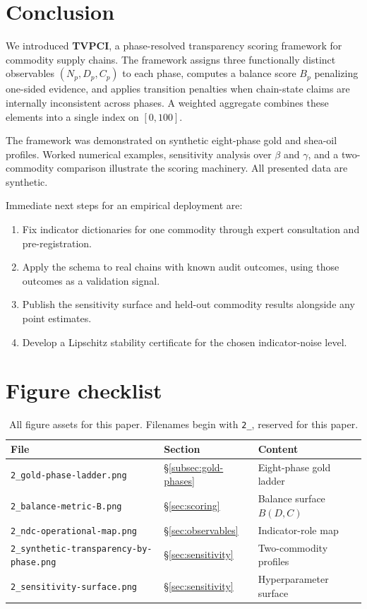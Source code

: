 \documentclass[12pt]{article}
\theoremstyle{remark}
\begin{document}
\section{Conclusion}\label{sec:conclusion}

We introduced \textbf{TVPCI}, a phase-resolved transparency scoring framework for
commodity supply chains.  The framework assigns three functionally distinct observables
$(N_p, D_p, C_p)$ to each phase, computes a balance score $B_p$ penalizing one-sided
evidence, and applies transition penalties when chain-state claims are internally
inconsistent across phases.  A weighted aggregate combines these elements into a single
index on $[0, 100]$.

The framework was demonstrated on synthetic eight-phase gold and shea-oil profiles.
Worked numerical examples, sensitivity analysis over $\beta$ and $\gamma$, and a
two-commodity comparison illustrate the scoring machinery.  All presented data are
synthetic.

Immediate next steps for an empirical deployment are:
\begin{enumerate}
  \item Fix indicator dictionaries for one commodity through expert consultation and
        pre-registration.
  \item Apply the schema to real chains with known audit outcomes, using those outcomes
        as a validation signal.
  \item Publish the sensitivity surface and held-out commodity results alongside any
        point estimates.
  \item Develop a Lipschitz stability certificate for the chosen indicator-noise level.
\end{enumerate}




\appendix
\section{Figure checklist}\label{app:figures}

\begin{table}[ht]
\centering
\caption{All figure assets for this paper.  Filenames begin with \texttt{2\_},
  reserved for this paper.\label{tab:figcheck}}
\renewcommand{\arraystretch}{1.15}
\begin{tabular}{ll>{\raggedright\arraybackslash}p{4.5cm}}
\toprule
File & Section & Content \\
\midrule
\texttt{2\_gold-phase-ladder.png} & \S\ref{subsec:gold-phases} & Eight-phase gold ladder \\
\texttt{2\_balance-metric-B.png} & \S\ref{sec:scoring} & Balance surface $B(D,C)$ \\
\texttt{2\_ndc-operational-map.png} & \S\ref{sec:observables} & Indicator-role map \\
\texttt{2\_synthetic-transparency-by-phase.png} & \S\ref{sec:sensitivity} & Two-commodity profiles \\
\texttt{2\_sensitivity-surface.png} & \S\ref{sec:sensitivity} & Hyperparameter surface \\\bottomrule
\end{tabular}
\end{table}
\end{document}
